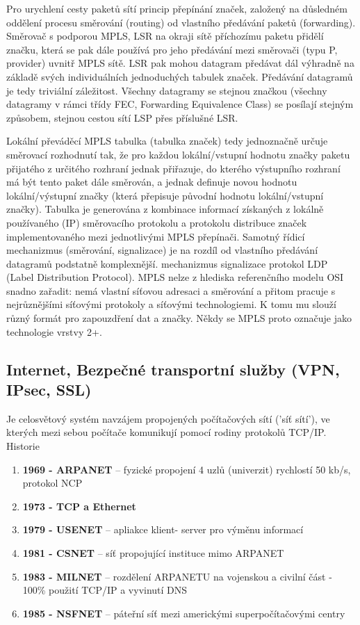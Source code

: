 Pro urychlení cesty paketů sítí princip přepínání značek, založený na důsledném oddělení procesu směrování (routing) od vlastního předávání paketů (forwarding).
Směrovač s podporou MPLS, LSR na okraji sítě příchozímu paketu přidělí značku, která se pak dále používá pro jeho předávání mezi směrovači (typu P, provider) uvnitř MPLS sítě. LSR pak mohou datagram předávat dál výhradně na základě svých individuálních jednoduchých tabulek značek. Předávání datagramů je tedy triviální záležitost. Všechny datagramy se stejnou značkou (všechny datagramy v rámci třídy FEC, Forwarding Equivalence Class) se posílají stejným způsobem, stejnou cestou sítí LSP přes příslušné LSR.

Lokální převáděcí MPLS tabulka (tabulka značek) tedy jednoznačně určuje směrovací rozhodnutí tak, že pro každou lokální/vstupní hodnotu značky paketu přijatého z určitého rozhraní jednak přiřazuje, do kterého výstupního rozhraní má být tento paket dále směrován, a jednak definuje novou hodnotu lokální/výstupní značky (která přepisuje původní hodnotu lokální/vstupní značky). Tabulka je generována z kombinace informací získaných z lokálně používaného (IP) směrovacího protokolu a protokolu distribuce značek implementovaného mezi jednotlivými MPLS přepínači. Samotný řídicí mechanizmus (směrování, signalizace) je na rozdíl od vlastního předávání datagramů podstatně komplexnější. mechanizmus signalizace protokol LDP (Label Distribution Protocol). MPLS nelze z hlediska referenčního modelu OSI snadno zařadit: nemá vlastní síťovou adresaci a směrování a přitom pracuje s nejrůznějšími síťovými protokoly a síťovými technologiemi. K tomu mu slouží různý formát pro zapouzdření dat a značky. Někdy se MPLS proto označuje jako technologie vrstvy 2+.
\subsection{Internet, Bezpečné transportní služby (VPN, IPsec, SSL)}
Je celosvětový systém navzájem propojených počítačových sítí ('síť sítí'), ve kterých mezi sebou počítače komunikují pomocí rodiny protokolů TCP/IP. \\
Historie
\begin{enumerate}
\item \textbf{1969 - ARPANET} -- fyzické propojení 4 uzlů (univerzit) rychlostí 50 kb/s, protokol NCP
\item \textbf{1973 - TCP a Ethernet}
\item \textbf{1979 - USENET} --  apliakce klient- server pro výměnu informací
\item \textbf{1981 - CSNET} -- síť propojující instituce mimo ARPANET
\item \textbf{1983 - MILNET} -- rozdělení ARPANETU na vojenskou a civilní část - 100\% použití TCP/IP a vyvinutí DNS
\item \textbf{1985 - NSFNET} -- páteřní síť mezi americkými superpočítačovými centry
\end{enumerate}

